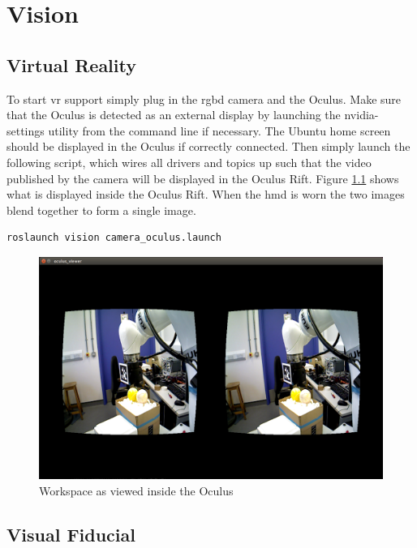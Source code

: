 \documentclass[headsepline,footinclude=false,fontsize=11pt,paper=a4,listof=totoc,bibliography=totoc,BCOR=12mm,DIV=14]{scrbook}
\begin{document}
\chapter{Vision}
\section{Virtual Reality}

To start \gls{vr}  support simply plug in the \gls{rgbd} camera and the Oculus. Make sure that the Oculus is detected as an external display by launching the nvidia-settings utility from the command line if necessary. The Ubuntu home screen should be displayed in the Oculus if correctly connected. Then simply launch the following script, which wires all drivers and topics up such that the video published by the camera will be displayed in the Oculus Rift. Figure \ref{fig:oculus_view} shows what is displayed inside the Oculus Rift. When the  \gls{hmd} is worn the two images blend together to form a single image.

\begin{lstlisting}[language=bash, caption={Launching virtual reality node}]
roslaunch vision camera_oculus.launch
\end{lstlisting}

\begin{figure}[h]
    \centering
    \includegraphics[width=14cm]{figures/oculus_view}
    \caption{Workspace as viewed inside the Oculus}
    \label{fig:oculus_view}
\end{figure}


\section{Visual Fiducial}
\end{document}
